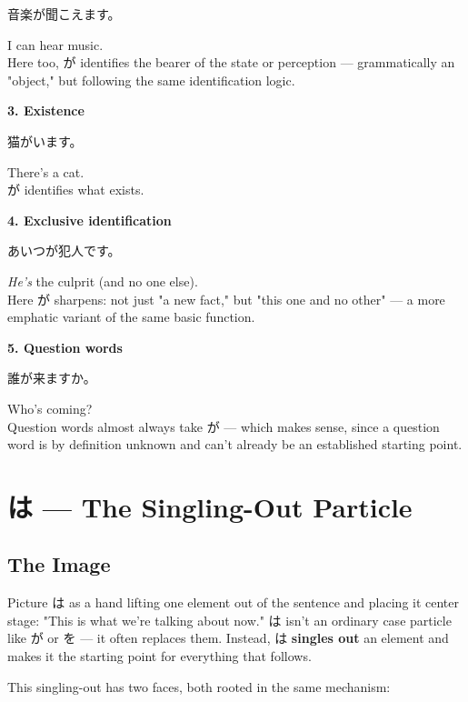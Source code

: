 \documentclass[12pt]{book}
\begin{document}
\par\quad 音楽が聞こえます。\\
\par\quad I can hear music.\\

Here too, が identifies the bearer of the state or perception — grammatically an "object," but following the same identification logic.

\textbf{3. Existence}
\par\quad 猫がいます。\\
\par\quad There's a cat.\\

が identifies what exists.

\textbf{4. Exclusive identification}
\par\quad あいつが犯人です。\\
\par\quad \emph{He's} the culprit (and no one else).\\

Here が sharpens: not just "a new fact," but "this one and no other" — a more emphatic variant of the same basic function.

\textbf{5. Question words}
\par\quad 誰が来ますか。\\
\par\quad Who's coming?\\

Question words almost always take が — which makes sense, since a question word is by definition unknown and can't already be an established starting point.


\chapter{は — The Singling-Out Particle}

\section*{The Image}

Picture は as a hand lifting one element out of the sentence and placing it center stage: "This is what we're talking about now." は isn't an ordinary case particle like が or を — it often replaces them. Instead, は \textbf{singles out} an element and makes it the starting point for everything that follows.

This singling-out has two faces, both rooted in the same mechanism:
\end{document}
